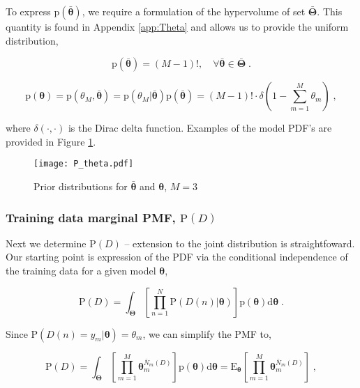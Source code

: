 \documentclass[12pt]{article}
\begin{document}
To express $\text{p}\left(\bar{\bm{\theta}}\right)$, we require a formulation of the hypervolume of set $\bar{\bm{\Theta}}$. This quantity is found in Appendix \ref{app:Theta} and allows us to provide the uniform distribution,

\begin{equation}
\text{p}\left(\bar{\bm{\theta}}\right)= (M-1)!,  \quad \forall \bar{\bm{\theta}} \in \bar{\bm{\Theta}} \;.
\end{equation}

\begin{equation}
\text{p}(\bm{\theta}) = \text{p}(\theta_M,\bar{\bm{\theta}}) = \text{p}\left( \theta_M | \bar{\bm{\theta}} \right) \text{p}\left(\bar{\bm{\theta}}\right)
= (M-1)! \cdot \delta\left( 1 - \sum_{m=1}^M \theta_m \right) \;,
\end{equation}

where $\delta(\cdot,\cdot)$ is the Dirac delta function. Examples of the model PDF's are provided in Figure \ref{fig:P_theta}.

\begin{figure}
\centering
\texttt{[image: P\_theta.pdf]}
\caption{Prior distributions for $\bar{\bm{\theta}}$ and $\bm{\theta}$, $M=3$}
\label{fig:P_theta}
\end{figure}


\subsubsection{Training data marginal PMF, $\text{P}(D)$}

Next we determine $\text{P}(D)$ -- extension to the joint distribution is straightfoward. Our starting point is expression of the PDF via the conditional independence of the training data for a given model $\bm{\theta}$,

\begin{equation}
\text{P}(D) = \int_{\bm{\Theta}} \left[ \prod_{n=1}^N \text{P}(D(n) | \bm{\theta}) \right] \text{p}(\bm{\theta}) \mathrm{d}\bm{\theta} \;.
\end{equation}

Since $\text{P}(D(n) = y_m | \bm{\theta}) = \theta_m$, we can simplify the PMF to,

\begin{equation} \label{P_D_int2}
\text{P}(D) = \int_{\bm{\Theta}} \left[ \prod_{m=1}^M \bm{\theta}_m^{\bar{N}_m(D)} \right] \text{p}(\bm{\theta}) \mathrm{d}\bm{\theta} 
= \text{E}_{\bm{\theta}} \left[ \prod_{m=1}^M \bm{\theta}_m^{\bar{N}_m(D)} \right] \;,
\end{equation}
\end{document}
